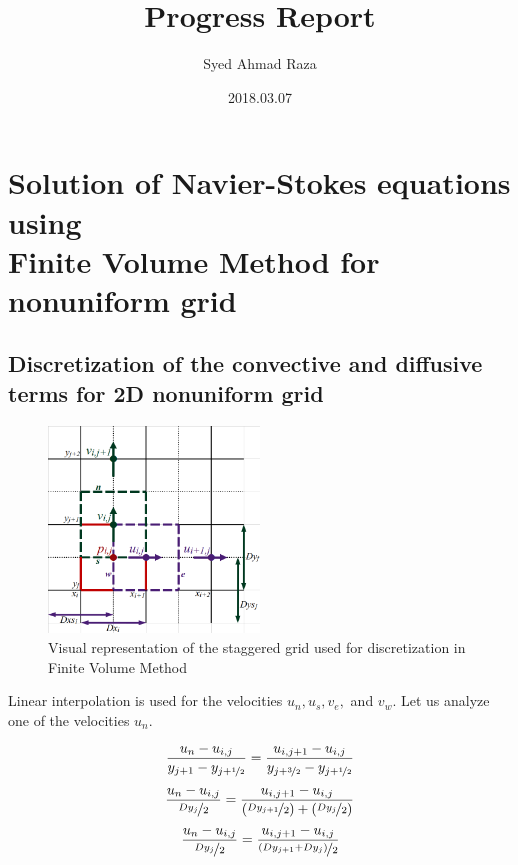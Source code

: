 \documentclass[12pt,a4paper,fleqn]{article}
\title{Progress Report}
\author{Syed Ahmad Raza}
\date{2018.03.07}
\begin{document}
\maketitle
\pagebreak

\section{Solution of Navier-Stokes equations using\\
    Finite Volume Method for nonuniform grid}

\subsection{Discretization of the convective and diffusive terms for 2D nonuniform grid}

\begin{figure}[H]
    \centering
    \includegraphics[width=0.5\textwidth]{staggered_grid.png}
    \caption{Visual representation of the staggered grid used for discretization in Finite Volume Method}
    \label{fig:staggered-grid}
\end{figure}

Linear interpolation is used for the velocities \(u_n, u_s, v_e,\) and \(v_w\). Let us analyze one of the velocities \(u_n\).

\begin{equation*}
\frac{u_n - u_{i,j}}{y_{j+1} - y_{j+\nicefrac{1}{2}}}
= \frac{u_{i,j+1} - u_{i,j}}{y_{j+\nicefrac{3}{2}} - y_{j+\nicefrac{1}{2}}}
\end{equation*}
\begin{equation*}
\frac{u_n - u_{i,j}}{\nicefrac{Dy_j}{2}}
= \frac{u_{i,j+1} - u_{i,j}}
{\left(\nicefrac{Dy_{j+1}}{2}\right) + \left(\nicefrac{Dy_j}{2}\right)}
\end{equation*}
\begin{equation*}
\frac{u_n - u_{i,j}}{\nicefrac{Dy_j}{2}}
= \frac{u_{i,j+1} - u_{i,j}}
{\nicefrac{\left(Dy_{j+1} +Dy_j\right)}{2}}
\end{equation*}
\end{document}
